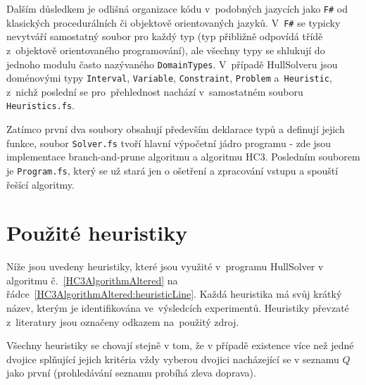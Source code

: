 Dalším důsledkem je odlišná organizace kódu v~podobných jazycích jako \texttt{F\#} od klasických procedurálních či objektově orientovaných jazyků. V~\texttt{F\#} se typicky nevytváří samostatný soubor pro každý typ (typ přibližně odpovídá třídě z~objektově orientovaného programování), ale všechny typy se shlukují do jednoho modulu často nazývaného \verb|DomainTypes|. V~případě HullSolveru jsou doménovými typy \verb|Interval|, \verb|Variable|, \verb|Constraint|, \verb|Problem| a~\verb|Heuristic|, z~nichž poslední se pro~přehlednost nachází v~samostatném souboru \verb|Heuristics.fs|.

Zatímco první dva soubory obsahují především deklarace typů a definují jejich funkce, soubor \verb|Solver.fs| tvoří hlavní výpočetní jádro programu - zde jsou implementace branch-and-prune algoritmu a algoritmu HC3. Posledním souborem je \verb|Program.fs|, který se už stará jen o ošetření a zpracování vstupu a spouští řešící algoritmy.

\section{Použité heuristiky}
\label{ch:usedHeuristics}
Níže jsou uvedeny heuristiky, které jsou využité v~programu HullSolver v algoritmu č.~\ref{HC3AlgorithmAltered} na řádce~\ref{HC3AlgorithmAltered:heuristicLine}. Každá heuristika má svůj krátký název, kterým je identifikována ve~výsledcích experimentů. Heuristiky převzaté z~literatury jsou označeny odkazem na~použitý zdroj.

Všechny heuristiky se chovají stejně v tom, že v případě existence více než jedné dvojice splňující jejich kritéria vždy vyberou dvojici nacházející se v seznamu $Q$ jako první (prohledávání seznamu probíhá zleva doprava).

